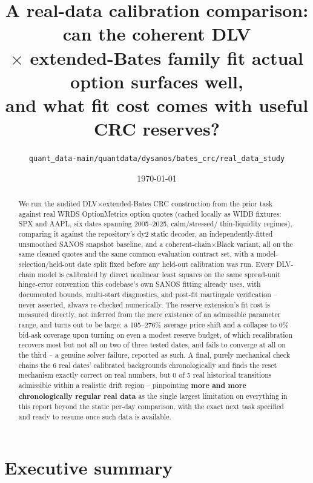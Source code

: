 \documentclass[11pt]{article}
\title{A real-data calibration comparison: can the coherent DLV\\
$\times$ extended-Bates family fit actual option surfaces well,\\
and what fit cost comes with useful CRC reserves?}
\author{\texttt{quant\_data-main/quantdata/dysanos/bates\_crc/real\_data\_study}}
\date{\today}
\begin{document}
\maketitle

\begin{abstract}
We run the audited DLV$\times$extended-Bates CRC construction from the
prior task against real WRDS OptionMetrics option quotes (cached locally as
WIDB fixtures: SPX and AAPL, six dates spanning 2005--2025, calm/stressed/
thin-liquidity regimes), comparing it against the repository's dy2 static
decoder, an independently-fitted unsmoothed SANOS snapshot baseline, and a
coherent-chain$\times$Black variant, all on the same cleaned quotes and the
same common evaluation contract set, with a model-selection/held-out date
split fixed before any held-out calibration was run. Every DLV-chain model
is calibrated by direct nonlinear least squares on the same spread-unit
hinge-error convention this codebase's own SANOS fitting already uses,
with documented bounds, multi-start diagnostics, and post-fit martingale
verification -- never asserted, always re-checked numerically. The reserve
extension's fit cost is measured directly, not inferred from the mere
existence of an admissible parameter range, and turns out to be large: a
195--276\% average price shift and a collapse to 0\% bid-ask coverage upon
turning on even a modest reserve budget, of which recalibration recovers
most but not all on two of three tested dates, and fails to converge at
all on the third -- a genuine solver failure, reported as such. A final,
purely mechanical check chains the 6 real dates' calibrated backgrounds
chronologically and finds the reset mechanism exactly correct on real
numbers, but 0 of 5 real historical transitions admissible within a
realistic drift region -- pinpointing \textbf{more and more chronologically
regular real data} as the single largest limitation on everything in this
report beyond the static per-day comparison, with the exact next task
specified and ready to resume once such data is available.
\end{abstract}

\tableofcontents

\section{Executive summary}
\label{sec:exec}
\end{document}
